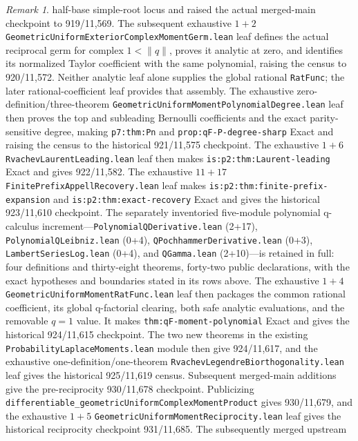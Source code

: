 \documentclass[11pt,oneside]{article}
\theoremstyle{definition}
\theoremstyle{remark}
\newtheorem{remark}[theorem]{Remark}
\begin{document}
\begin{remark}
half-base simple-root locus and raised the actual merged-main checkpoint to
919/11,569.  The subsequent exhaustive \(1+2\)
\nolinkurl{GeometricUniformExteriorComplexMomentGerm.lean} leaf defines the
actual reciprocal germ for complex \(1<\lVert q\rVert\), proves it analytic at
zero, and identifies its normalized Taylor coefficient with the same
polynomial, raising the census to 920/11,572.  Neither
analytic leaf alone supplies the global rational \nolinkurl{RatFunc}; the
later rational-coefficient leaf provides that assembly.  The exhaustive
zero-definition/three-theorem
\nolinkurl{GeometricUniformMomentPolynomialDegree.lean} leaf then proves the
top and subleading Bernoulli coefficients and the exact parity-sensitive
degree, making \nolinkurl{p7:thm:Pn} and
\nolinkurl{prop:qF-P-degree-sharp} Exact and raising the census to the
historical 921/11,575 checkpoint.  The exhaustive \(1+6\)
\nolinkurl{RvachevLaurentLeading.lean} leaf then makes
\nolinkurl{is:p2:thm:Laurent-leading} Exact and gives 922/11,582.  The
exhaustive \(11+17\) \nolinkurl{FinitePrefixAppellRecovery.lean} leaf makes
\nolinkurl{is:p2:thm:finite-prefix-expansion} and
\nolinkurl{is:p2:thm:exact-recovery} Exact and gives the historical
923/11,610 checkpoint.  The separately inventoried five-module polynomial
q-calculus increment---\nolinkurl{PolynomialQDerivative.lean} (2+17),
\nolinkurl{PolynomialQLeibniz.lean} (0+4),
\nolinkurl{QPochhammerDerivative.lean} (0+3),
\nolinkurl{LambertSeriesLog.lean} (0+4), and
\nolinkurl{QGamma.lean} (2+10)---is retained in full: four definitions and
thirty-eight theorems, forty-two public declarations, with the exact
hypotheses and boundaries stated in its rows above.  The exhaustive \(1+4\)
\nolinkurl{GeometricUniformMomentRatFunc.lean} leaf then packages the common
rational coefficient, its global q-factorial clearing, both safe analytic
evaluations, and the removable \(q=1\) value.  It makes
\nolinkurl{thm:qF-moment-polynomial} Exact and gives the historical
924/11,615 checkpoint.  The two new theorems in the existing
\nolinkurl{ProbabilityLaplaceMoments.lean} module then give 924/11,617, and
the exhaustive one-definition/one-theorem
\nolinkurl{RvachevLegendreBiorthogonality.lean} leaf gives the historical
925/11,619 census.  Subsequent merged-main additions give the pre-reciprocity
930/11,678 checkpoint.  Publicizing
\nolinkurl{differentiable_geometricUniformComplexMomentProduct} gives
930/11,679, and the exhaustive \(1+5\)
\nolinkurl{GeometricUniformMomentReciprocity.lean} leaf gives the historical
reciprocity checkpoint 931/11,685.  The subsequently merged upstream

\end{remark}
\end{document}
